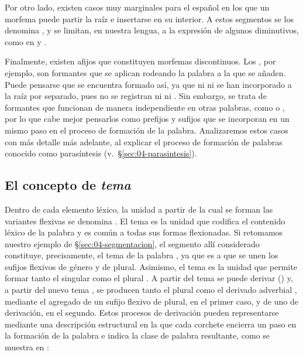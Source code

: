 Por otro lado, existen casos muy marginales para el español en los que un
morfema puede partir la raíz e insertarse en su interior. A estos segmentos se
los denomina , y se limitan, en nuestra lengua, a la expresión
de algunos diminutivos, como en  y .

Finalmente, existen afijos que constituyen morfemas discontinuos. Los
, por ejemplo, son formantes que se aplican rodeando la
palabra a la que se añaden. Puede pensarse que  se
encuentra formado así, ya que ni  ni  se han incorporado
a la raíz  por separado, pues no se registran ni
 ni . Sin embargo, se
trata de formantes que funcionan de manera independiente en otras palabras,
como  o , por lo que cabe mejor pensarlos
como prefijos y sufijos que se incorporan en un mismo paso en el proceso de
formación de la palabra. Analizaremos estos casos con más detalle más adelante,
al explicar el proceso de formación de palabras conocido como parasíntesis
(v.~§\ref{sec:04-parasintesis}).

\subsection{El concepto de \textit{tema}}\label{sec:04-tema}

Dentro de cada elemento léxico, la unidad a partir de la cual se forman las
variantes flexivas se denomina . El tema es la unidad que codifica
el contenido léxico de la palabra y es común a todas sus formas flexionadas. Si
retomamos nuestro ejemplo de §\ref{sec:04-segmentacion}, el segmento
 allí considerado constituye, precisamente, el tema de la palabra
, ya que es a  que se unen los sufijos flexivos
 de género y  de plural. Asimismo, el tema 
es la unidad que permite formar tanto el singular  como el plural
. A partir del tema  se puede derivar
 () y, a partir del nuevo tema
, se producen tanto el plural  como el derivado
adverbial , mediante el agregado de un sufijo flexivo de
plural, en el primer caso, y de uno de derivación, en el segundo. Estos procesos
de derivación pueden representarse mediante una descripción estructural en la
que cada corchete encierra un paso en la formación de la palabra e indica la
clase de palabra resultante, como se muestra en :

